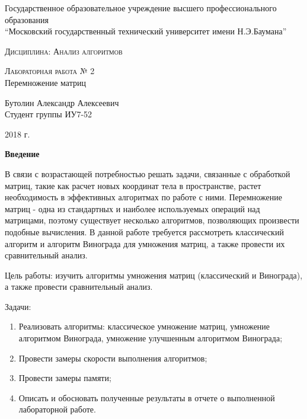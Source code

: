 \documentclass[12pt,a4paper]{scrartcl}
\begin{document}
	\begin{titlepage}
		\begin{center}
		\large
		Государственное образовательное учреждение высшего профессионального образования\\
		“Московский государственный технический университет имени Н.Э.Баумана”
		\vspace{0.25cm}
		
		
		\textsc{Дисциплина: Анализ алгоритмов}\\[5mm]
		\vfill
			
		\textsc{Лабораторная работа № 2}\\[5mm]
		
		{\LARGE Перемножение матриц}
		\bigskip
		
			
		Бутолин Александр Алексеевич\\
		Студент группы ИУ7-52
		\vfill		
		
		\end{center}
		\begin{center}
			2018 г.
		\end{center}
	\end{titlepage}

	

\begin{center}
	\textbf{Введение}
	\label{sec:intro}
\end{center}

В связи с возрастающей потребностью решать задачи, связанные с обработкой матриц, такие как расчет новых координат тела в пространстве, растет необходимость в эффективных алгоритмах по работе с ними. 
Перемножение матриц - одна из стандартных и наиболее используемых операций над матрицами, поэтому существует несколько алгоритмов, позволяющих произвести подобные вычисления. 
В данной работе требуется рассмотреть классический алгоритм и алгоритм Винограда для умножения матриц, а также провести их сравнительный анализ.

Цель работы: изучить алгоритмы умножения матриц (классический и Винограда), а также провести сравнительный анализ. 

Задачи: 

\begin{enumerate}
	\item {Реализовать алгоритмы: классическое умножение матриц, умножение алгоритмом Винограда, умножение улучшенным алгоритмом Винограда; }
	\item {Провести замеры скорости выполнения алгоритмов;} 
	\item {Провести замеры памяти; }
	\item {Описать и обосновать полученные результаты в отчете о выполненной лабораторной работе.}
\end{enumerate}
\end{document}
